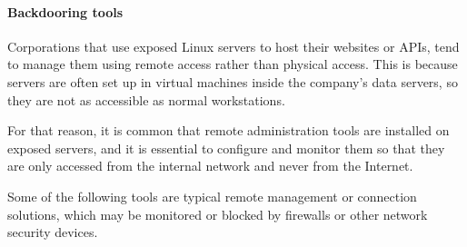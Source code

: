 \paragraph{Backdooring tools}
Corporations that use exposed Linux servers to host their websites or APIs\footnotemark, tend to manage them using remote access rather than physical access. This is because servers are often set up in virtual machines inside the company's data servers, so they are not as accessible as normal workstations.

For that reason, it is common that remote administration tools are installed on exposed servers, and it is essential to configure and monitor them so that they are only accessed from the internal network and never from the Internet. 

Some of the following tools are typical remote management or connection solutions, which may be monitored or blocked by firewalls or other network security devices.



